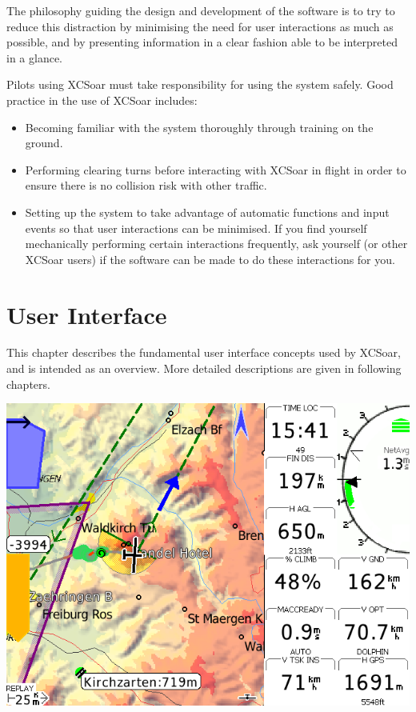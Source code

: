 \documentclass[a4paper,12pt]{refrep}
\begin{document}
The philosophy guiding the design and development of the software is
to try to reduce this distraction by minimising the need for user
interactions as much as possible, and by presenting information in a
clear fashion able to be interpreted in a glance.

Pilots using XCSoar must take responsibility for using the system safely.
Good practice in the use of XCSoar includes:
\begin{itemize}
\item Becoming familiar with the system thoroughly through training on 
  the ground.
\item Performing clearing turns before interacting with XCSoar in flight
  in order to ensure there is no collision risk with other traffic.
\item Setting up the system to take advantage of automatic functions
  and input events so that user interactions can be minimised.  If you
  find yourself mechanically performing certain interactions frequently,
  ask yourself (or other XCSoar users) if the software can be made to do 
  these interactions for you.
\end{itemize}


\chapter{User Interface}\label{cha:interface}
This chapter describes the fundamental user interface concepts used by
XCSoar, and is intended as an overview.  More detailed descriptions
are given in following chapters.


\begin{center}
\includegraphics[angle=0,width=\linewidth,keepaspectratio='true']{figures/plain.png}
\end{center}
\end{document}
